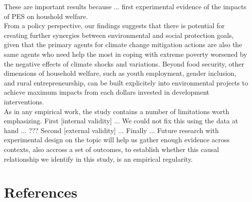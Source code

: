 \documentclass[preprint,12pt]{elsarticle}
\begin{document}
These are important results because ... first experimental evidence of the impacts of PES on houshold welfare. \\

From a policy perspective, our findings suggests that there is potential for creating further synergies between environmental and social protection goals, given that the primary agents for climate change mitigation actions are also the same agents who need help the most in coping with extreme poverty worsened by the negative effects of climate shocks and variations. Beyond food security, other dimensions of household welfare, such as youth employment, gender inclusion, and rural entrepreneurship, can be built explicitely into environmental projects to achieve maximum impacts from each dollars invested in development interventions.    \\

As in any empirical work, the study contains a number of limitations worth emphasizing. First [internal validity] ... We could not fix this using the data at hand ... ???
Second [external validity] ... Finally ...
Future research with experimental design on the topic will help us gather enough evidence across contexts, also accross a set of outcomes, to establish whether this causal relationship we identify in this study, is an empirical regularity.






\clearpage
\newpage
\section*{References}

\end{document}
